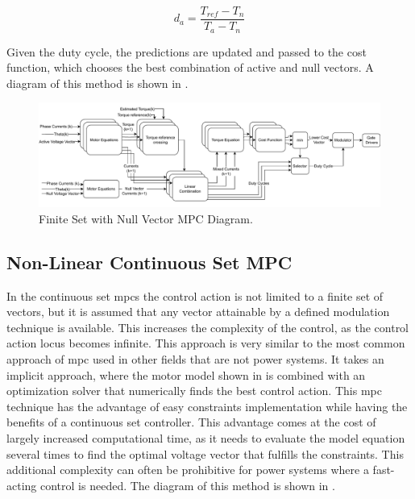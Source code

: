 \begin{equation}
	d_a = \frac{T_{ref} - T_n}{T_a-T_n}
	\label{eq:duty_cycle}
\end{equation}


Given the duty cycle, the predictions are updated and passed to the cost function, which chooses the best combination of active and null vectors. A diagram of this method is shown in .

\begin{figure}[!htb]
	\centering
	\includegraphics[width=1\textwidth]{Figures/FSMPC_null_vector.pdf}
	\caption[Finite Set with Null Vector MPC Diagram.]{Finite Set with Null Vector MPC Diagram.}
	\label{fig:FSMPC_null_Diagram}%
\end{figure}

\subsection{Non-Linear Continuous Set MPC}

In the continuous set \gls{mpc}s the control action is not limited to a finite set of vectors, but it is assumed that any vector attainable by a defined modulation technique is available. This increases the complexity of the control, as the control action locus becomes infinite.
 This approach is very similar to the most common approach of \gls{mpc} used in other fields that are not power systems. It takes an implicit approach, where the motor model shown in  is combined with an optimization solver that numerically finds the best control action. This \gls{mpc} technique has the advantage of easy constraints implementation while having the benefits of a continuous set controller. This advantage comes at the cost of largely increased computational time, as it needs to evaluate the model equation several times to find the optimal voltage vector that fulfills the constraints. This additional complexity can often be prohibitive for power systems where a fast-acting control is needed. The diagram of this method is shown in .

